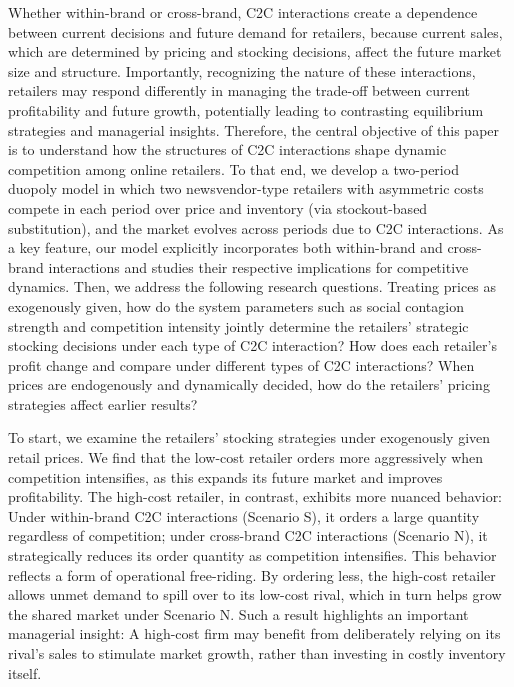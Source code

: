 \documentclass[nonblindrev,copyedit]{informs1}
\begin{document}
Whether within-brand or cross-brand, C2C interactions create a dependence between current decisions and future demand for retailers, because current sales, which are determined by pricing and stocking decisions, affect the future market size and structure. Importantly, recognizing the nature of these interactions, retailers may respond differently in managing the trade-off between current profitability and future growth, potentially leading to contrasting equilibrium strategies and managerial insights. Therefore, the central objective of this paper is to understand how the structures of C2C interactions shape dynamic competition among online retailers. To that end, we develop a two-period duopoly model in which two newsvendor-type retailers with asymmetric costs compete in each period over price and inventory (via stockout-based substitution), and the market evolves across periods due to C2C interactions. As a key feature, our model explicitly incorporates both within-brand and cross-brand interactions and studies their respective implications for competitive dynamics. Then, we address the following research questions. Treating prices as exogenously given, how do the system parameters such as social contagion strength and competition intensity jointly determine the retailers' strategic stocking decisions under each type of C2C interaction? How does each retailer’s profit change and compare under different types of C2C interactions? When prices are endogenously and dynamically decided, how do the retailers' pricing strategies affect earlier results?

To start, we examine the retailers’ stocking strategies under exogenously given retail prices. We find that the low-cost retailer orders more aggressively when competition intensifies, as this expands its future market and improves profitability. The high-cost retailer, in contrast, exhibits more nuanced behavior: Under within-brand C2C interactions (Scenario S), it orders a large quantity regardless of competition; under cross-brand C2C interactions (Scenario N), it strategically reduces its order quantity as competition intensifies. This behavior reflects a form of operational free-riding. By ordering less, the high-cost retailer allows unmet demand to spill over to its low-cost rival, which in turn helps grow the shared market under Scenario N. Such a result highlights an important managerial insight: A high-cost firm may benefit from deliberately relying on its rival’s sales to stimulate market growth, rather than investing in costly inventory itself.
\end{document}
